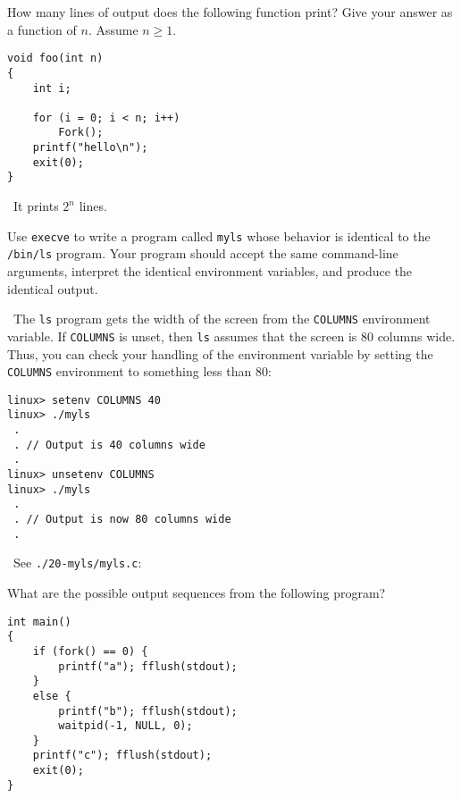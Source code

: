 \documentclass[12pt]{article}
\newenvironment{ex}[2][Exercise]{\begin{trivlist}
		\item[\hskip \labelsep {\bfseries #1}\hskip \labelsep {\bfseries #2.}]}{\end{trivlist}}
\newenvironment{sol}[1][Solution]{\begin{trivlist}
		\item[\hskip \labelsep {\bfseries #1:}]}{\end{trivlist}}
\begin{document}
\begin{ex}{8.19}
	How many lines of output does the following function print? Give your answer as a function of
	$n$. Assume $n\geq 1$.
	\begin{lstlisting}
void foo(int n)
{
	int i;
	
	for (i = 0; i < n; i++)
		Fork();
	printf("hello\n");
	exit(0);
}
	\end{lstlisting}
\end{ex}

\begin{sol}
	\
	It prints $2^n$ lines.
\end{sol}

\begin{ex}{8.20}
	Use \texttt{execve} to write a program called \texttt{myls} whose behavior is identical to the
	\texttt{/bin/ls} program. Your program should accept the same command-line arguments, interpret
	the identical environment variables, and produce the identical output.
	
	\
	The \texttt{ls} program gets the width of the screen from the \texttt{COLUMNS} environment variable. If
	\texttt{COLUMNS} is unset, then \texttt{ls} assumes that the screen is 80 columns wide.
	Thus, you can check your handling of the environment variable by setting the \texttt{COLUMNS}
	environment to something less than 80:
	\begin{lstlisting}[language={}]
linux> setenv COLUMNS 40
linux> ./myls
 .
 . // Output is 40 columns wide
 .
linux> unsetenv COLUMNS
linux> ./myls
 .
 . // Output is now 80 columns wide
 .
	\end{lstlisting}
\end{ex}

\begin{sol}
	\
	See \texttt{./20-myls/myls.c}:
	
\end{sol}

\begin{ex}{8.21}
	What are the possible output sequences from the following program?\\
	\begin{lstlisting}
int main()
{
	if (fork() == 0) {
		printf("a"); fflush(stdout);
	}
	else {
		printf("b"); fflush(stdout);
		waitpid(-1, NULL, 0);
	}
	printf("c"); fflush(stdout);
	exit(0);
}
	\end{lstlisting}
\end{ex}
\end{document}
